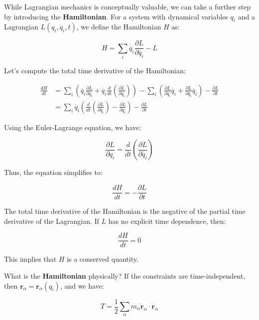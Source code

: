 While Lagrangian mechanics is conceptually valuable, we can take a further step by 
introducing the \textbf{Hamiltonian}. For a system with dynamical variables $q_i$ and a 
Lagrangian $L(q_i, \dot{q}_i, t)$, we define the Hamiltonian $H$ as:

\begin{equation}
    H=\sum_i \dot{q_i} \frac{\partial L}{\partial \dot{q_i}} - L
\end{equation}

Let's compute the total time derivative of the Hamiltonian:

\begin{align}
   \frac{dH}{dt}&=\sum_i \left(\ddot{q_i} \frac{\partial L}{\partial \dot{q_i}} + \dot{q_i} \frac{d}{dt} \left(\frac{\partial L}{\partial \dot{q_i}}\right)\right) - \sum_i \left(\frac{\partial L}{\partial q_i} \dot{q_i} + \frac{\partial L}{\partial \dot{q_i}} \ddot{q_i} \right) - \frac{\partial L}{\partial t}\\
   &=\sum_i\dot{q_i}\left(\frac{d}{dt} \left(\frac{\partial L}{\partial \dot{q_i}}\right)-\frac{\partial L}{\partial q_i}\right)-\frac{\partial L}{\partial t}
\end{align}

Using the Euler-Lagrange equation, we have:

\begin{equation}
    \frac{\partial L}{\partial q_i}=\frac{d}{dt} \left(\frac{\partial L}{\partial \dot{q_i}}\right)
\end{equation}

Thus, the equation simplifies to:

\begin{equation}
    \frac{dH}{dt}=-\frac{\partial L}{\partial t}
\end{equation}

The total time derivative of the Hamiltonian is the negative of the partial time 
derivative of the Lagrangian. If $L$ has no explicit time dependence, then:

\begin{equation}
    \frac{dH}{dt}=0
\end{equation}

This implies that $H$ is a conserved quantity.

What is the \textbf{Hamiltonian} physically? If the constraints are time-independent, then $\mathbf{r}_\alpha = \mathbf{r}_\alpha(q_i)$, and we have:

\begin{equation}
    T=\frac{1}{2} \sum_\alpha m_\alpha \dot{\mathbf{r}}_\alpha \cdot \dot{\mathbf{r}}_\alpha
\end{equation}

